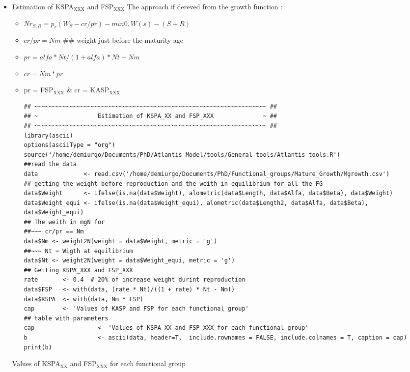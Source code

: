 \documentclass[11pt]{article}
\begin{document}
\begin{itemize}
\begin{itemize}
\item Estimation of KSPA$_{\mathrm{XXX}}$ and FSP$_{\mathrm{XXX}}$
    The approach if dereved from the growth function :
\begin{itemize}
\item \(Nr_{S, R} = p_{r}(W_{S} - cr / pr) - min{0, W(s) - (S + R)}\)
\item \(cr / pr = Nm\) \#\# weight just before the maturity age
\item \(pr = {alfa * Nt}/{(1 + alfa) * Nt - Nm}\)
\item \(cr = Nm*pr\)
\item pr = FSP$_{\mathrm{XXX}}$ \& cr = KASP$_{\mathrm{XXX}}$

\begin{verbatim}
## ~~~~~~~~~~~~~~~~~~~~~~~~~~~~~~~~~~~~~~~~~~~~~~~~~~~~~~~~~~~~~~~~~~ ##
## ~                 Estimation of KSPA_XX and FSP_XXX              ~ ##
## ~~~~~~~~~~~~~~~~~~~~~~~~~~~~~~~~~~~~~~~~~~~~~~~~~~~~~~~~~~~~~~~~~~ ##
library(ascii)
options(asciiType = "org")
source('/home/demiurgo/Documents/PhD/Atlantis_Model/tools/General_tools/Atlantis_tools.R')
##read the data
data             <- read.csv('/home/demiurgo/Documents/PhD/Functional_groups/Mature_Growth/Mgrowth.csv')
## getting the weight before reproduction and the weith in equilibrium for all the FG
data$Weight      <- ifelse(is.na(data$Weight), alometric(data$Length, data$Alfa, data$Beta), data$Weight)
data$Weight_equi <- ifelse(is.na(data$Weight_equi), alometric(data$Length2, data$Alfa, data$Beta), data$Weight_equi)
## The weith in mgN for
##~~~ cr/pr == Nm
data$Nm <- weight2N(weight = data$Weight, metric = 'g')
##~~~ Nt = Wigth at equilibrium
data$Nt <- weight2N(weight = data$Weight_equi, metric = 'g')
## Getting KSPA_XXX and FSP_XXX
rate       <- 0.4  # 20% of increase weight durint reproduction
data$FSP   <- with(data, (rate * Nt)/((1 + rate) * Nt - Nm))
data$KSPA  <- with(data, Nm * FSP)
cap        <- 'Values of KASP and FSP for each functional group'
## table with parameters
cap                  <- 'Values of KSPA_XX and FSP_XXX for each functional group'
b                    <- ascii(data, header=T,  include.rownames = FALSE, include.colnames = T, caption = cap)
print(b)
\end{verbatim}
\end{itemize}
\begin{table}[htb]
\caption{Values of KSPA$_{\mathrm{XX}}$ and FSP$_{\mathrm{XXX}}$ for each functional group}
\begin{center}

\end{center}
\end{table}
\end{itemize}
\end{itemize}
\end{document}
